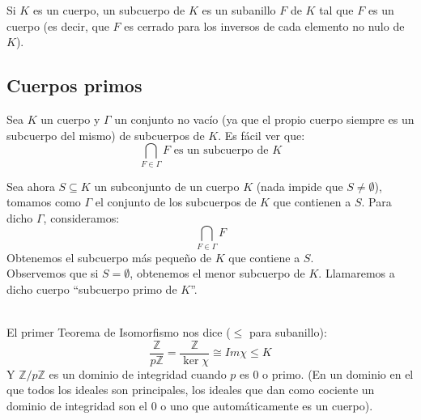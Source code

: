 \begin{definicion}[Subcuerpo]
    Si $K$ es un cuerpo, un subcuerpo de $K$ es un subanillo $F$ de $K$ tal que $F$ es un cuerpo (es decir, que $F$ es cerrado para los inversos de cada elemento no nulo de $K$).
\end{definicion}

\subsection{Cuerpos primos}
Sea $K$ un cuerpo y $\Gamma$ un conjunto no vacío (ya que el propio cuerpo siempre es un subcuerpo del mismo) de subcuerpos de $K$. Es fácil ver que:
\begin{equation*}
    \bigcap_{F\in \Gamma} F \text{\ es un subcuerpo de } K
\end{equation*}

Sea ahora $S\subseteq K$ un subconjunto de un cuerpo $K$ (nada impide que $S\neq \emptyset $), tomamos como $\Gamma$ el conjunto de los subcuerpos de $K$ que contienen a $S$. Para dicho $\Gamma$, consideramos:
\begin{equation*}
    \bigcap_{F\in \Gamma} F
\end{equation*}
Obtenemos el subcuerpo más pequeño de $K$ que contiene a $S$.\\

\noindent
Observemos que si $S = \emptyset $, obtenemos el menor subcuerpo de $K$. Llamaremos a dicho cuerpo ``subcuerpo primo de $K$''.

\\
\noindent
El primer Teorema de Isomorfismo nos dice ($\leq$ para subanillo):
\begin{equation*}
    \dfrac{\mathbb{Z}}{p\mathbb{Z}} = \dfrac{\mathbb{Z}}{\ker\chi} \cong Im\chi \leq K
\end{equation*}
Y $\mathbb{Z}/p\mathbb{Z}$ es un dominio de integridad cuando $p$ es $0$ o primo. (En un dominio en el que todos los ideales son principales, los ideales que dan como cociente un dominio de integridad son el 0 o uno que automáticamente es un cuerpo). %

